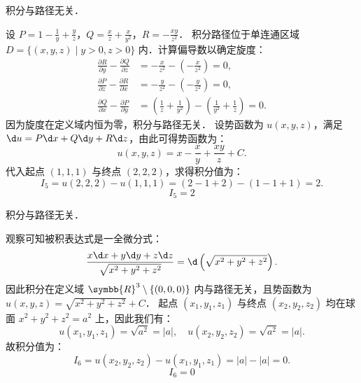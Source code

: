 \begin{solution}
     积分与路径无关．

    设 $P = 1 - \frac{1}{y} + \frac{y}{z}$，$Q = \frac{x}{z} + \frac{x}{y^2}$，$R = -\frac{xy}{z^2}$．
    积分路径位于单连通区域 $D = \{(x,y,z) \mid y > 0, z > 0\}$ 内．计算偏导数以确定旋度：
    \begin{equation}
        \label{eq:deriv-check-5}
        \begin{aligned}
            \frac{\partial R}{\partial y} - \frac{\partial Q}{\partial z} & = -\frac{x}{z^2} - \left(-\frac{x}{z^2}\right) = 0,                                        \\
            \frac{\partial P}{\partial z} - \frac{\partial R}{\partial x} & = -\frac{y}{z^2} - \left(-\frac{y}{z^2}\right) = 0,                                        \\
            \frac{\partial Q}{\partial x} - \frac{\partial P}{\partial y} & = \left(\frac{1}{z} + \frac{1}{y^2}\right) - \left(\frac{1}{y^2} + \frac{1}{z}\right) = 0.
        \end{aligned}
    \end{equation}
    因为旋度在定义域内恒为零，积分与路径无关．
    设势函数为 $u(x, y, z)$，满足 $\d u = P \d x + Q \d y + R \d z$，由此可得势函数为：
    \begin{equation}
        u(x, y, z) = x - \frac{x}{y} + \frac{xy}{z} + C.
    \end{equation}
    代入起点 $(1,1,1)$ 与终点 $(2,2,2)$，求得积分值为：
    \begin{equation}
        I_5 = u(2,2,2) - u(1,1,1) = (2 - 1 + 2) - (1 - 1 + 1) = 2.
    \end{equation}
    \begin{equation}
        I_5 = \boxed{2}
    \end{equation}

     积分与路径无关．

    观察可知被积表达式是一全微分式：
    \begin{equation}
        \frac{x \d x + y \d y + z \d z}{\sqrt{x^2+y^2+z^2}} = \d \left( \sqrt{x^2+y^2+z^2} \right).
    \end{equation}
    因此积分在定义域 $\symbb{R}^3 \setminus \{(0,0,0)\}$ 内与路径无关，且势函数为 $u(x, y, z) = \sqrt{x^2+y^2+z^2} + C$．
    起点 $(x_1, y_1, z_1)$ 与终点 $(x_2, y_2, z_2)$ 均在球面 $x^2+y^2+z^2 = a^2$ 上，因此我们有：
    \begin{equation}
        u(x_1, y_1, z_1) = \sqrt{a^2} = |a|, \quad u(x_2, y_2, z_2) = \sqrt{a^2} = |a|.
    \end{equation}
    故积分值为：
    \begin{equation}
        I_6 = u(x_2, y_2, z_2) - u(x_1, y_1, z_1) = |a| - |a| = 0.
    \end{equation}
    \begin{equation}
        I_6 = \boxed{0}
    \end{equation}
\end{solution}

